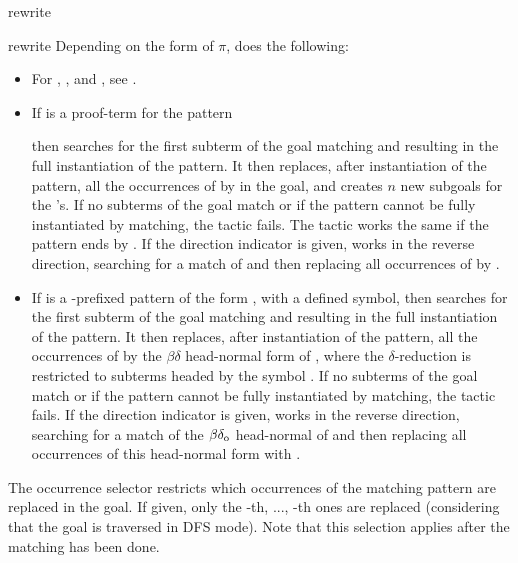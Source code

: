 \begin{tactic}{rewrite}
\begin{tsyntax}[empty]{rewrite}
  Depending on the form of $\pi$,  does the following:
    \begin{itemize}
    \item For \tct{//}, \tct{/=}, and \tct{//=}, see .
    \item If  is a proof-term for the pattern
      \begin{center}
      \end{center}
      \noindent then  searches for the first subterm of the goal
      matching  and resulting in the full instantiation of the pattern.
      It then replaces, after instantiation of the pattern, all the occurrences
      of  by  in the goal, and creates $n$ new subgoals for the
      's. If no subterms of the goal match  or if the pattern
      cannot be fully instantiated by matching, the tactic fails.
      The tactic works the same if the pattern ends by . If the
      direction indicator \tct{-} is given,  works in the reverse
      direction, searching for a match of  and then replacing all
      occurrences of  by .
    \item If  is a \tct{/}-prefixed pattern of the form ,
      with  a defined symbol, then  searches for the first subterm
      of the goal matching  and resulting in the full instantiation
      of the pattern. It then replaces, after instantiation of the pattern, all
      the occurrences of  by the $\beta\delta$ head-normal form
      of , where the $\delta$-reduction is restricted to subterms
      headed by the symbol . If no subterms of the goal match  or
      if the pattern cannot be fully instantiated by matching, the tactic fails. If the
      direction indicator \tct{-} is given,  works in the reverse
      direction, searching for a match of the $\beta\delta_{\rm o}$ head-normal
      of  and then replacing all occurrences of this head-normal
      form with .
    \end{itemize}
    
    \smallskip
    
    The occurrence selector  restricts which occurrences
    of the matching pattern are replaced in the goal. If given, only the
    -th, ..., -th ones are replaced (considering that the goal is
    traversed in DFS mode). Note that this selection applies after the matching has
    been done.
    

\end{tsyntax}
\end{tactic}
